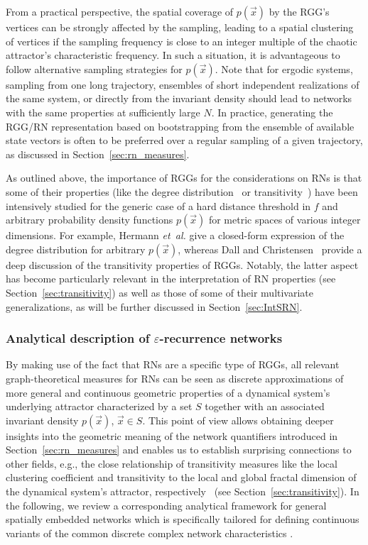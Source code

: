 		From a practical perspective, the spatial coverage of $p(\vec{x})$ by the RGG's vertices can be strongly affected by the sampling, leading to a spatial clustering of vertices if the sampling frequency is close to an integer multiple of the chaotic attractor's characteristic frequency. In such a situation, it is advantageous to follow alternative sampling strategies for $p(\vec{x})$. Note that for ergodic systems, sampling from one long trajectory, ensembles of short independent realizations of the same system, or directly from the invariant density should lead to networks with the same properties at sufficiently large $N$. In practice, generating the RGG/RN representation based on bootstrapping from the ensemble of available state vectors is often to be preferred over a regular sampling of a given trajectory, as discussed in Section~\ref{sec:rn_measures}.

		As outlined above, the importance of RGGs for the considerations on RNs is that some of their properties (like the degree distribution~\cite{Herrmann2003} or transitivity~\cite{Dall2002}) have been intensively studied for the generic case of a hard distance threshold in $f$ and arbitrary probability density functions $p(\vec{x})$ for metric spaces of various integer dimensions. For example, Hermann \textit{et~al.} \cite{Herrmann2003} give a closed-form expression of the degree distribution for arbitrary $p(\vec{x})$, whereas Dall and Christensen~\cite{Dall2002} provide a deep discussion of the transitivity properties of RGGs. Notably, the latter aspect has become particularly relevant in the interpretation of RN properties (see Section~\ref{sec:transitivity}) as well as those of some of their multivariate generalizations, as will be further discussed in Section~\ref{sec:IntSRN}.


		\subsubsection{Analytical description of $\varepsilon$-recurrence networks}
		By making use of the fact that RNs are a specific type of RGGs, all relevant graph-theoretical measures for RNs can be seen as discrete approximations of more general and continuous geometric properties of a dynamical system's underlying attractor characterized by a set $S$ together with an associated invariant density $p(\vec{x})$, $\vec{x}\in S$. This point of view allows obtaining deeper insights into the geometric meaning of the network quantifiers introduced in Section~\ref{sec:rn_measures} and enables us to establish surprising connections to other fields, e.g., the close relationship of transitivity measures like the local clustering coefficient and transitivity to the local and global fractal dimension of the dynamical system's attractor, respectively~\cite{Donner2011b} (see Section~\ref{sec:transitivity}). In the following, we review a corresponding analytical framework for general spatially embedded networks which is specifically tailored for defining continuous variants of the common discrete complex network characteristics \cite{Donges2012}.


